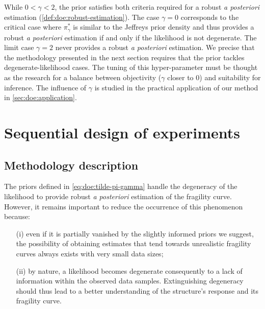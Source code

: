 

While $0<\gamma<2$, the prior satisfies both criteria required for a robust \emph{a posteriori} estimation (\cref{def:doe:robust-estimation}). The case $\gamma=0$ corresponds to the critical case where $\pi^\ast_\gamma$ is similar to the Jeffreys prior density and thus provides a robust \emph{a posteriori} estimation if and only if the likelihood is not degenerate. The limit case $\gamma=2$ never provides a robust \emph{a posteriori} estimation. We precise that the methodology presented in the next section requires that the prior tackles degenerate-likelihood cases. The tuning of this hyper-parameter must be thought as the research for a balance between objectivity ($\gamma$ closer to $0$) and suitability for inference. The influence of $\gamma$ is studied in the practical application of our method in \cref{sec:doe:application}.











\section{Sequential design of experiments%
}\label{sec:doe:PEmethod}

\subsection{Methodology description}



The priors defined in \cref{eq:doe:tilde-pi-gamma} handle the degeneracy of the likelihood to provide robust \emph{a posteriori} estimation of the fragility curve. However, it remains important to reduce the occurrence of this phenomenon because: %
    \begin{enumerate}
        \item[(i)] even if it is partially vanished by the slightly informed priors we suggest, { the possibility of obtaining estimates that tend towards unrealistic fragility curves always exists with very small data sizes;}
        \item[(ii)] by nature, a likelihood becomes degenerate consequently to a lack of information within the observed data samples. Extinguishing degeneracy should thus lead to a better understanding of the structure's response and its fragility curve.
    \end{enumerate}


